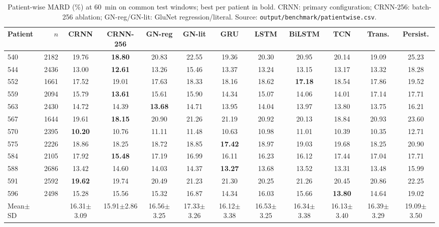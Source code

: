 \begin{table}[t]\centering
\caption{Patient-wise MARD (\%) at 60~min on common test windows; best per patient in bold. CRNN: primary configuration; CRNN-256: batch-256 ablation; GN-reg/GN-lit: GluNet regression/literal. Source: \texttt{output/benchmark/patientwise.csv}.}
\scriptsize\setlength{\tabcolsep}{3pt}
\begin{tabular}{lrcccccccccc}\toprule
Patient & $n$ & CRNN & CRNN-256 & GN-reg & GN-lit & GRU & LSTM & BiLSTM & TCN & Trans. & Persist.\\\midrule
540 & 2182 & 19.76 & \textbf{18.80} & 20.83 & 22.55 & 19.36 & 20.30 & 20.95 & 20.14 & 19.09 & 25.23\\
544 & 2436 & 13.00 & \textbf{12.61} & 13.26 & 15.46 & 13.37 & 13.24 & 13.15 & 13.17 & 13.32 & 18.28\\
552 & 1661 & 17.52 & 19.01 & 17.63 & 18.33 & 18.16 & 18.62 & \textbf{17.18} & 18.54 & 17.86 & 19.52\\
559 & 2094 & 15.79 & \textbf{13.61} & 15.61 & 15.90 & 14.34 & 15.07 & 14.06 & 14.01 & 17.14 & 17.71\\
563 & 2430 & 14.72 & 14.39 & \textbf{13.68} & 14.71 & 13.95 & 14.04 & 13.97 & 13.80 & 13.75 & 16.21\\
567 & 1644 & 19.61 & \textbf{18.15} & 20.90 & 21.26 & 21.19 & 20.92 & 20.13 & 18.84 & 20.93 & 23.60\\
570 & 2395 & \textbf{10.20} & 10.76 & 11.11 & 11.48 & 10.63 & 10.98 & 11.01 & 10.39 & 10.35 & 12.71\\
575 & 2226 & 18.86 & 18.25 & 18.72 & 18.85 & \textbf{17.42} & 18.97 & 19.03 & 19.68 & 18.25 & 20.90\\
584 & 2105 & 17.92 & \textbf{15.48} & 17.19 & 16.99 & 16.11 & 16.23 & 16.12 & 17.44 & 17.04 & 17.71\\
588 & 2686 & 13.42 & 14.60 & 14.03 & 14.37 & \textbf{13.27} & 13.68 & 13.52 & 13.31 & 13.48 & 15.99\\
591 & 2592 & \textbf{19.62} & 19.74 & 20.49 & 21.23 & 21.30 & 20.25 & 21.26 & 20.45 & 20.86 & 22.25\\
596 & 2498 & 15.28 & 15.56 & 15.32 & 16.87 & 14.34 & 16.03 & 15.66 & \textbf{13.80} & 14.64 & 19.02\\
\midrule
Mean$\pm$SD & & 16.31$\pm$3.09 & 15.91$\pm$2.86 & 16.56$\pm$3.25 & 17.33$\pm$3.26 & 16.12$\pm$3.38 & 16.53$\pm$3.25 & 16.34$\pm$3.38 & 16.13$\pm$3.40 & 16.39$\pm$3.29 & 19.09$\pm$3.50\\
\bottomrule
\end{tabular}\end{table}
